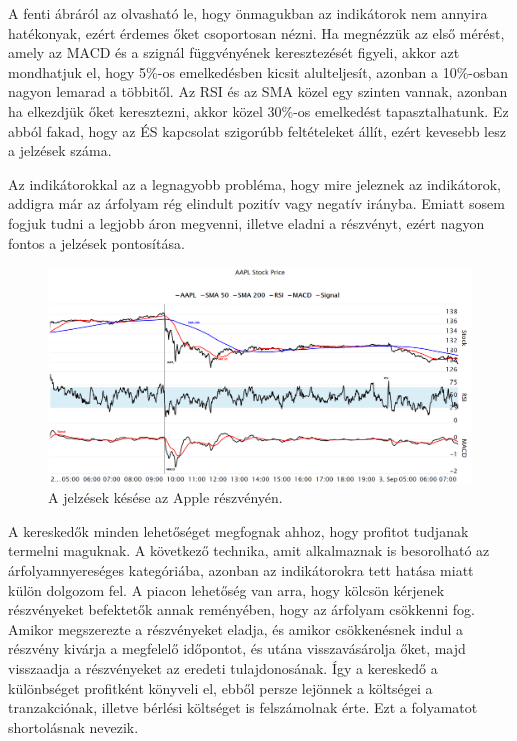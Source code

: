 \noindent A fenti ábráról az olvasható le, hogy önmagukban az indikátorok nem annyira hatékonyak, ezért érdemes őket csoportosan nézni. Ha megnézzük az első mérést, amely az MACD és a szignál függvényének keresztezését figyeli, akkor azt mondhatjuk el, hogy 5\%-os emelkedésben kicsit alulteljesít, azonban a 10\%-osban nagyon lemarad a többitől. Az RSI és az SMA közel egy szinten vannak, azonban ha elkezdjük őket keresztezni, akkor közel 30\%-os emelkedést tapasztalhatunk. Ez abból fakad, hogy az ÉS kapcsolat szigorúbb feltételeket állít, ezért kevesebb lesz a jelzések száma.

Az indikátorokkal az a legnagyobb probléma, hogy mire jeleznek az indikátorok, addigra már az árfolyam rég elindult pozitív vagy negatív irányba. Emiatt sosem fogjuk tudni a legjobb áron megvenni, illetve eladni a részvényt, ezért nagyon fontos a jelzések pontosítása.
\begin{figure}[ht]
\centering
\includegraphics[width=\textwidth]{images/indicator_error.png}
\caption{A jelzések késése az Apple részvényén.}
\label{fig:indicator_error}
\end{figure}
\newpage
{}
A kereskedők minden lehetőséget megfognak ahhoz, hogy profitot tudjanak termelni maguknak. A következő technika, amit alkalmaznak is besorolható az árfolyamnyereséges kategóriába, azonban az indikátorokra tett hatása miatt külön dolgozom fel. A piacon lehetőség van arra, hogy kölcsön kérjenek részvényeket befektetők annak reményében, hogy az árfolyam csökkenni fog. Amikor megszerezte a részvényeket eladja, és amikor csökkenésnek indul a részvény kivárja a megfelelő időpontot, és utána visszavásárolja őket, majd visszaadja a részvényeket az eredeti tulajdonosának. Így a kereskedő a különbséget profitként könyveli el, ebből persze lejönnek a költségei a tranzakciónak, illetve bérlési költséget is felszámolnak érte. Ezt a folyamatot shortolásnak nevezik.

